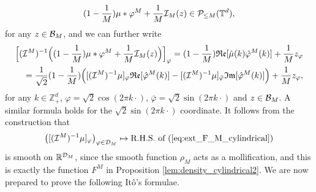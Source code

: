  \[
 (1 - \frac{1}{M}) \mu \ast \varphi^M + \frac{1}{M}\mathcal{I}_M(z) \in \mathcal{P}_{\leq M}(\mathbb{T}^d), 
\]
for any $z \in \mathcal{B}_M$, and we can further write
\begin{align*}
    \Big[(\mathcal{I}^M)^{-1} \Big( (1 - \frac{1}{M}) \mu \ast \varphi^M + \frac{1}{M}\mathcal{I}_M(z)\Big)\Big]_{\varphi} = (1 - \frac{1}{M})\mathfrak{Re}[\hat{\mu}(k)\hat{\varphi}^M(k)] + \frac{1}{M}z_{\varphi}\\
    = \frac{1}{\sqrt{2}}(1 - \frac{1}{M})\Big([(\mathcal{I}^M)^{-1}\mu]_{\varphi}\mathfrak{Re}[\hat{\varphi}^M(k)]-[(\mathcal{I}^M)^{-1}\mu]_{\bar{\varphi}}\mathfrak{Im}[\hat{\varphi}^M(k)] \Big) + \frac{1}{M}z_{\varphi},
\end{align*}
for any $k \in \mathbb{Z}_+^d$, $\varphi = \sqrt{2}\cos(2\pi k \cdot )$, $\bar{\varphi} = \sqrt{2}\sin(2\pi k \cdot )$ and $z \in \mathcal{B}_M$. A similar formula holds for the $\sqrt{2}\sin(2\pi k \cdot )$ coordinate. It follows from the construction that 
\[
\big([(\mathcal{I}^M)^{-1} \mu]_{\varphi}\big)_{\varphi \in \mathcal{D}_M} \mapsto \text{R.H.S. of (\ref{eq:ext_F_M_cylindrical})}
\]
is smooth on $\mathbb{R}^{\mathcal{D}_M}$, since the smooth function $\rho_M$ acts as a mollification, and this is exactly the function $F^M$ in Proposition \ref{lem:density_cylindrical2}. We are now prepared to prove the following It\^o's formulae.

